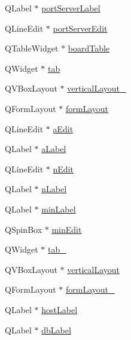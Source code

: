 \begin{DoxyCompactItemize}
\item 
Q\+Label $\ast$ \hyperlink{class_ui___config_dialog_adb2ad693ad797d1de771d745fc56ae08}{port\+Server\+Label}
\item 
Q\+Line\+Edit $\ast$ \hyperlink{class_ui___config_dialog_a85fdeaaf4e410bde6c7e4d39569417b3}{port\+Server\+Edit}
\item 
Q\+Table\+Widget $\ast$ \hyperlink{class_ui___config_dialog_a2178945f54a5989f93028a631c6d518e}{board\+Table}
\item 
Q\+Widget $\ast$ \hyperlink{class_ui___config_dialog_abc0b19b9f3944c0ae3fee1dd7c15344b}{tab}
\item 
Q\+V\+Box\+Layout $\ast$ \hyperlink{class_ui___config_dialog_af5f65710198ff9ebf521e048a20559a8}{vertical\+Layout\+\_}
\item 
Q\+Form\+Layout $\ast$ \hyperlink{class_ui___config_dialog_aaac64e19b3088c5db168bc6a0ea06c08}{form\+Layout}
\item 
Q\+Line\+Edit $\ast$ \hyperlink{class_ui___config_dialog_a3ed761758a228a16f1744575761cfdfb}{a\+Edit}
\item 
Q\+Label $\ast$ \hyperlink{class_ui___config_dialog_a9201e098f361d4d8d25e02eaa153c9ea}{a\+Label}
\item 
Q\+Line\+Edit $\ast$ \hyperlink{class_ui___config_dialog_ab8df805e7d5b237a5696b1466508a3c3}{n\+Edit}
\item 
Q\+Label $\ast$ \hyperlink{class_ui___config_dialog_a56cf8f73de62fc3141f04e41592d05f7}{n\+Label}
\item 
Q\+Label $\ast$ \hyperlink{class_ui___config_dialog_a9f726f4a7956fe6cd4728aa2138daf18}{min\+Label}
\item 
Q\+Spin\+Box $\ast$ \hyperlink{class_ui___config_dialog_a5e9081581ad995e83648d7bec4242ac2}{min\+Edit}
\item 
Q\+Widget $\ast$ \hyperlink{class_ui___config_dialog_aa9c536dc2ee3e349092724657875f9ad}{tab\+\_}
\item 
Q\+V\+Box\+Layout $\ast$ \hyperlink{class_ui___config_dialog_a0d9257ada11998b26bb7e21d1c70ade3}{vertical\+Layout}
\item 
Q\+Form\+Layout $\ast$ \hyperlink{class_ui___config_dialog_a70f15f1b92334a76765efccd75e8b97d}{form\+Layout\+\_}
\item 
Q\+Label $\ast$ \hyperlink{class_ui___config_dialog_ad6c996779702e7c1a1544e38ee1b683a}{host\+Label}
\item 
Q\+Label $\ast$ \hyperlink{class_ui___config_dialog_ae83b0bdbaf99966b3910aaf20069c7d3}{db\+Label}
\item 

\end{DoxyCompactItemize}

